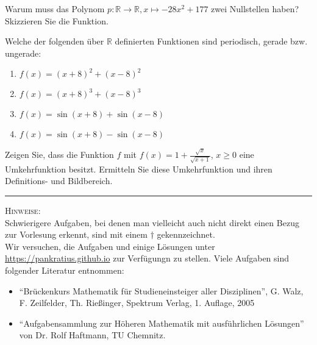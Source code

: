 \documentclass[11pt]{article}
\begin{document}
\begin{task}
	Warum muss das Polynom $p:\mathbb{R}\to \mathbb{R},x\mapsto -28x^2+177$ zwei Nullstellen haben? Skizzieren Sie die Funktion.
\end{task}
\begin{task}
Welche der folgenden \"uber $\mathbb{R}$ definierten Funktionen sind periodisch, gerade bzw. ungerade:
\begin{enumerate}
	\item $f(x)=(x+8)^2+(x-8)^2$
	\item $f(x)=(x+8)^3+(x-8)^3$
	\item $f(x)=\sin(x+8)+\sin(x-8)$
	\item $f(x)=\sin(x+8)-\sin(x-8)$
\end{enumerate}
\end{task}
\begin{htask}
	Zeigen Sie, dass die Funktion $f$ mit $f(x)=1+\frac{\sqrt{x}}{\sqrt{x+1}}$, $x \geq 0$ eine Umkehrfunktion besitzt. Ermitteln Sie diese Umkehrfunktion und ihren Definitions- und Bildbereich.
\end{htask}

\hrule
\vspace{.5cm}
\noindent
\textsc{Hinweise:}\\
Schwierigere Aufgaben, bei denen man vielleicht auch nicht direkt einen Bezug zur Vorlesung erkennt, sind mit einem $\dagger$ gekennzeichnet.\\
Wir versuchen, die Aufgaben und einige Lösungen unter \url{https://pankratius.github.io} zur Verfügungn zu stellen.
Viele Aufgaben sind folgender Literatur entnommen:
\begin{itemize}
	\item ``Br\"uckenkurs Mathematik f\"ur Studieneinsteiger aller Disziplinen'', G. Walz, F. Zeilfelder, Th. Rie\ss inger, Spektrum Verlag, 1. Auflage, 2005
	\item ``Aufgabensammlung zur H\"oheren Mathematik mit ausf\"uhrlichen L\"osungen'' von Dr. Rolf Haftmann, TU Chemnitz.
\end{itemize}
\end{document}
